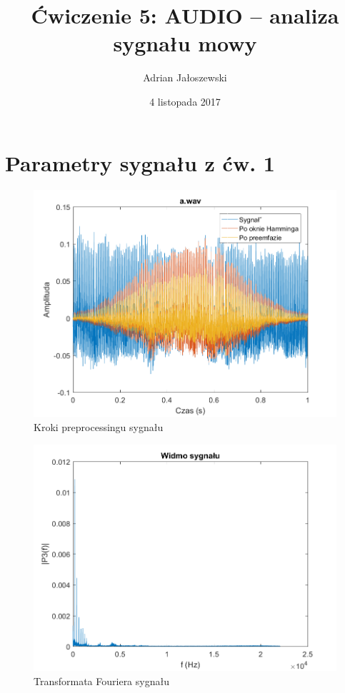 \documentclass[a4paper, 12pt, titlepage]{article}
\author{Adrian Jałoszewski}
\title{Ćwiczenie 5: AUDIO -- analiza sygnału mowy}
\date{4 listopada 2017}
\begin{document}
    \maketitle
    \section{Parametry sygnału z ćw. 1} 
        \begin{figure}[H]
            \centering
            \includegraphics[width=0.8\linewidth]{Hamming.png}
            \caption{Kroki preprocessingu sygnału}
        \end{figure}
        \begin{figure}[H]
            \centering
            \includegraphics[width=0.8\linewidth]{FFT.png}
            \caption{Transformata Fouriera sygnału}
        \end{figure}
\end{document}
